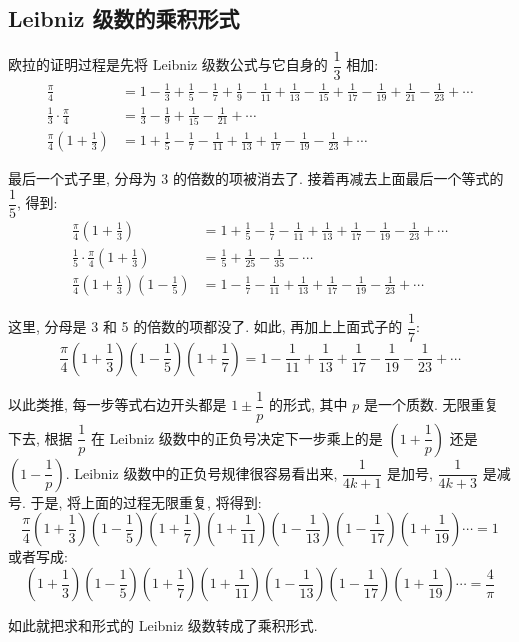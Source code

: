 \subsection{Leibniz 级数的乘积形式}

欧拉的证明过程是先将 Leibniz 级数公式与它自身的 $\dfrac{1}{3}$ 相加:
\begin{align*}
\frac{\pi}{4} &= 1-\frac{1}{3}+\frac{1}{5}-\frac{1}{7} +\frac{1}{9} - \frac{1}{11} + \frac{1}{13} - \frac{1}{15} + \frac{1}{17} - \frac{1}{19} + \frac{1}{21} - \frac{1}{23} +\cdots \\
\frac{1}{3}\cdot\frac{\pi}{4} &= \frac{1}{3}-\frac{1}{9}+\frac{1}{15}-\frac{1}{21}+\cdots \\
\frac{\pi}{4}(1+\frac{1}{3})&=1+\frac{1}{5}-\frac{1}{7}-\frac{1}{11}+\frac{1}{13}+\frac{1}{17}-\frac{1}{19}-\frac{1}{23}+\cdots
\end{align*}

最后一个式子里, 分母为 3 的倍数的项被消去了. 接着再减去上面最后一个等式的 $\dfrac{1}{5}$, 得到:
\begin{align*}
\frac{\pi}{4}(1+\frac{1}{3})&=1+\frac{1}{5}-\frac{1}{7}-\frac{1}{11}+\frac{1}{13}+\frac{1}{17}-\frac{1}{19}-\frac{1}{23}+\cdots\\
\frac{1}{5}\cdot\frac{\pi}{4}(1+\frac{1}{3}) &= \frac{1}{5} + \frac{1}{25} - \frac{1}{35} - \cdots \\
\frac{\pi}{4}(1+\frac{1}{3})(1-\frac{1}{5})&=1-\frac{1}{7}-\frac{1}{11}+\frac{1}{13}+\frac{1}{17}-\frac{1}{19}-\frac{1}{23}+\cdots
\end{align*}

这里, 分母是 3 和 5 的倍数的项都没了. 如此, 再加上上面式子的 $\dfrac{1}{7}$:
\[  
\frac{\pi}{4}(1+\frac{1}{3})(1-\frac{1}{5})(1+\frac{1}{7}) = 1- \frac{1}{11}+\frac{1}{13}+\frac{1}{17}-\frac{1}{19} - \frac{1}{23} + \cdots
\]

以此类推, 每一步等式右边开头都是 $ 1\pm\dfrac{1}{p} $ 的形式, 其中 $ p $ 是一个质数. 无限重复下去, 根据 $\dfrac{1}{p}$ 在 Leibniz 级数中的正负号决定下一步乘上的是 $(1+\dfrac{1}{p})$ 还是 $(1-\dfrac{1}{p})$. Leibniz 级数中的正负号规律很容易看出来, $\dfrac{1}{4k+1}$ 是加号, $\dfrac{1}{4k+3}$ 是减号. 于是, 将上面的过程无限重复, 将得到: 
\[
\frac{\pi}{4}(1+\frac{1}{3})(1-\frac{1}{5})(1+\frac{1}{7})(1+\frac{1}{11})(1-\frac{1}{13})(1-\frac{1}{17})(1+\frac{1}{19}) \cdots = 1
\] 
或者写成:
\[
(1+\frac{1}{3})(1-\frac{1}{5})(1+\frac{1}{7})(1+\frac{1}{11})(1-\frac{1}{13})(1-\frac{1}{17})(1+\frac{1}{19}) \cdots = \frac{4}{\pi}
\]

如此就把求和形式的 Leibniz 级数转成了乘积形式.

